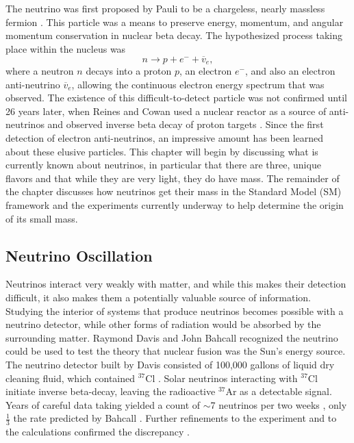 The neutrino was first proposed by Pauli to be a chargeless, nearly massless fermion \citep{Pauli}.  This particle was a means to preserve energy, momentum, and angular momentum conservation in nuclear beta decay.  The hypothesized process taking place within the nucleus was
\begin{equation}
n \rightarrow p + e^- + \overline{v}_e,
\end{equation}
where a neutron $n$ decays into a proton $p$, an electron $e^-$, and also an electron anti-neutrino $\overline{v}_e$, allowing the continuous electron energy spectrum that was observed. The existence of this difficult-to-detect particle was not confirmed until 26 years later, when Reines and Cowan used a nuclear reactor as a source of anti-neutrinos and observed inverse beta decay of proton targets \citep{poltergeist}.  Since the first detection of electron anti-neutrinos, an impressive amount has been learned about these elusive particles.  This chapter will begin by discussing what is currently known about neutrinos, in particular that there are three, unique flavors and that while they are very light, they do have mass.  The remainder of the chapter discusses how neutrinos get their mass in the Standard Model (SM) framework and the experiments currently underway to help determine the origin of its small mass.

\subsection{Neutrino Oscillation}
Neutrinos interact very weakly with matter, and while this makes their detection difficult, it also makes them a potentially valuable source of information.  Studying the interior of systems that produce neutrinos becomes possible with a neutrino detector, while other forms of radiation would be absorbed by the surrounding matter.  Raymond Davis and John Bahcall recognized the neutrino could be used to test the theory that nuclear fusion was the Sun's energy source.  The neutrino detector built by Davis consisted of 100,000 gallons of liquid dry cleaning fluid, which contained $^{37}$Cl \citep{DavisInitial}.  Solar neutrinos interacting with $^{37}$Cl initiate inverse beta-decay, leaving the radioactive $^{37}$Ar as a detectable signal.  Years of careful data taking yielded a count of $\sim$7 neutrinos per two weeks \citep{DavisInitial}, only $\frac{1}{3}$ the rate predicted by Bahcall \citep{BahcallSun}.  Further refinements to the experiment and to the calculations confirmed the discrepancy \citep{Davis}.

